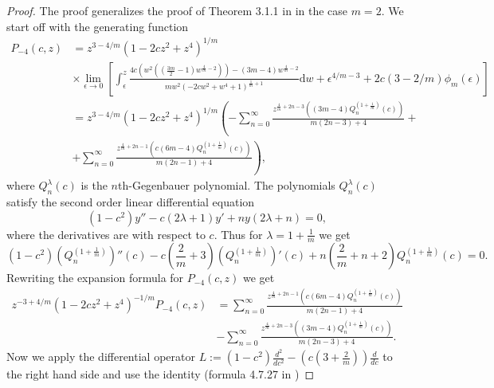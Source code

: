 \documentclass[review,nopreprintline]{elsarticle}
\theoremstyle{definition}
\numberwithin{equation}{section}
\theoremstyle{remark}
\begin{document}
	   \begin{proof}        
	  The proof generalizes the proof of Theorem 3.1.1 in \cite{Cox2013DJKMPolynomials} in  the case $m=2$.   We start off with the generating function
	        \begin{align*}
	            P_{-4}(c,z)&=z^{3-4/m} (1-2 c z^2+z^4)^{1/m}\\
	            &\times\lim_{\epsilon\to 0}\left[\int_{\epsilon}^{z}\frac{4 c \left(w^2 \left(\left(\frac{3 m}{2}-1\right) w^{\frac{4}{m}-2}\right)\right)-(3 m-4) w^{\frac{4}{m}-2}}{m w^2 \left(-2 c w^2+w^4+1\right)^{\frac{1}{m}+1}}  \textrm{d}w+\epsilon^{4/m-3}+2c(3-2/m)\phi_m(\epsilon)\right] \\
	            &=z^{3-4/m} (1-2 c z^2+z^4)^{1/m} \left(-\sum _{n=0}^{\infty } \frac{z^{\frac{4}{m}+2 n-3} \left((3 m-4) Q_n^{\left(1+\frac{1}{m}\right)}(c)\right)}{m (2 n-3)+4}+\right.\\
	            &+\left. \sum _{n=0}^{\infty } \frac{z^{\frac{4}{m}+2 n-1} \left(c (6 m-4) Q_n^{\left(1+\frac{1}{m}\right)}(c)\right)}{m (2 n-1)+4}\right),
	        \end{align*}
	        where $Q_n^\lambda(c)$ is the $n$th-Gegenbauer polynomial. The polynomials $Q_n^\lambda(c)$ satisfy the second order linear differential equation
	        \begin{equation*}
	            \left(1-c^2\right) y''-c (2 \lambda +1) y'+n y (2 \lambda +n)=0,
	        \end{equation*}
	        where the derivatives are with respect to $c$. Thus for $\lambda = 1+\frac{1}{m}$ we get
	        \begin{equation}
	            \left(1-c^2\right) (Q_n^{\left(1+\frac{1}{m}\right)})''(c)-c \left(\frac{2}{m}+3\right) (Q_n^{\left(1+\frac{1}{m}\right)})'(c)+n \left(\frac{2}{m}+n+2\right) Q_n^{\left(1+\frac{1}{m}\right)}(c)=0.
	        \end{equation}
	        Rewriting the expansion formula for $P_{-4}(c,z)$ we get
	        \begin{align}\label{eq3.3}
	            z^{-3+4/m} (1-2 c z^2+z^4)^{-1/m}P_{-4}(c,z)&= \sum _{n=0}^{\infty } \frac{z^{\frac{4}{m}+2 n-1} \left(c (6 m-4) Q_n^{\left(1+\frac{1}{m}\right)}(c)\right)}{m (2 n-1)+4} \nonumber\\
	            &- \sum _{n=0}^{\infty } \frac{z^{\frac{4}{m}+2 n-3} \left((3 m-4) Q_n^{\left(1+\frac{1}{m}\right)}(c)\right)}{m (2 n-3)+4}.
	        \end{align}
	        Now we apply the differential operator $L:=(1-c^2)\frac{d^2}{dc^2}-(c(3+\frac{2}{m}))\frac{d}{dc}$ to the right hand side and  use the identity  (formula 4.7.27 in \cite{Szego1939})

\end{proof}
\end{document}
